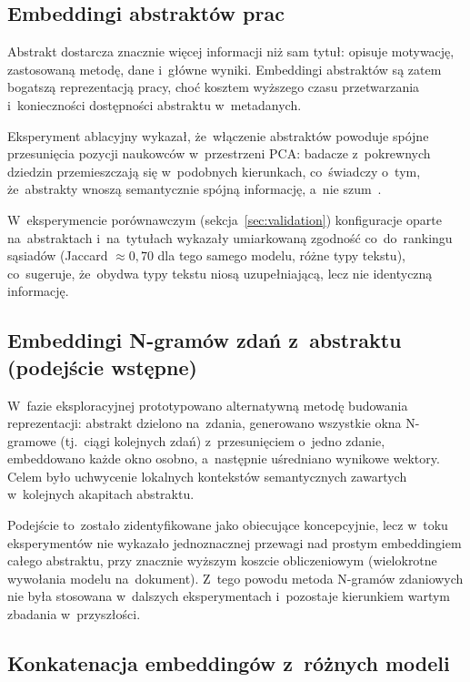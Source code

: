 \subsection{Embeddingi abstraktów prac}
\label{subsec:abstracts}

Abstrakt dostarcza znacznie więcej informacji niż sam tytuł:
opisuje motywację, zastosowaną metodę, dane i~główne wyniki.
Embeddingi abstraktów są zatem bogatszą reprezentacją pracy,
choć kosztem wyższego czasu przetwarzania i~konieczności
dostępności abstraktu w~metadanych.

Eksperyment ablacyjny wykazał, że~włączenie abstraktów powoduje
spójne przesunięcia pozycji naukowców w~przestrzeni PCA:
badacze z~pokrewnych dziedzin przemieszczają się w~podobnych
kierunkach, co~świadczy o~tym, że~abstrakty wnoszą
semantycznie spójną informację, a~nie szum~\cite{ic_report}.

W~eksperymencie porównawczym (sekcja~\ref{sec:validation})
konfiguracje oparte na~abstraktach i~na~tytułach wykazały
umiarkowaną zgodność co~do~rankingu sąsiadów
(Jaccard $\approx 0{,}70$ dla tego samego modelu,
różne typy tekstu), co~sugeruje, że~obydwa typy tekstu
niosą uzupełniającą, lecz nie identyczną informację.

\subsection{Embeddingi N-gramów zdań z~abstraktu (podejście wstępne)}
\label{subsec:ngrams}

W~fazie eksploracyjnej prototypowano alternatywną metodę
budowania reprezentacji: abstrakt dzielono na~zdania,
generowano wszystkie okna N-gramowe (tj.\ ciągi kolejnych zdań)
z~przesunięciem o~jedno zdanie, embeddowano każde okno osobno,
a~następnie uśredniano wynikowe wektory.
Celem było uchwycenie lokalnych kontekstów semantycznych
zawartych w~kolejnych akapitach abstraktu.

Podejście to~zostało zidentyfikowane jako obiecujące koncepcyjnie,
lecz w~toku eksperymentów nie wykazało jednoznacznej przewagi
nad prostym embeddingiem całego abstraktu, przy znacznie wyższym
koszcie obliczeniowym (wielokrotne wywołania modelu na~dokument).
Z~tego powodu metoda N-gramów zdaniowych nie była stosowana
w~dalszych eksperymentach i~pozostaje kierunkiem wartym
zbadania w~przyszłości.

\subsection{Konkatenacja embeddingów z~różnych modeli}
\label{subsec:concat}

